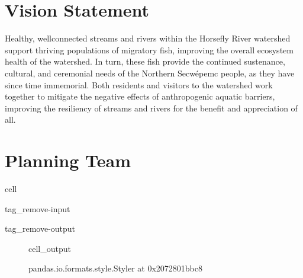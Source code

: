 \documentclass[letterpaper,10pt,english]{jupyterBook}
\begin{document}
\chapter{Vision Statement}
\label{\detokenize{Planning:vision-statement}}
\sphinxAtStartPar
Healthy, well\sphinxhyphen{}connected streams and rivers within the Horsefly River watershed support thriving populations of migratory fish, improving the overall ecosystem health of the watershed. In turn, these fish provide the continued sustenance, cultural, and ceremonial needs of the Northern Secwépemc people, as they have since time immemorial. Both residents and visitors to the watershed work together to mitigate the negative effects of anthropogenic aquatic barriers, improving the resiliency of streams and rivers for the benefit and appreciation of all.


\chapter{Planning Team}
\label{\detokenize{Planning:planning-team}}
\begin{sphinxuseclass}{cell}
\begin{sphinxuseclass}{tag_remove-input}
\begin{sphinxuseclass}{tag_remove-output}
\end{sphinxuseclass}
\end{sphinxuseclass}
\end{sphinxuseclass}
\begin{figure}[htbp]
\centering
\capstart
\begin{sphinxVerbatimOutput}

\begin{sphinxuseclass}{cell_output}
\begin{sphinxVerbatim}[commandchars=\\\{\}]
\PYGZlt{}pandas.io.formats.style.Styler at 0x2072801bbc8\PYGZgt{}
\end{sphinxVerbatim}

\end{sphinxuseclass}\end{sphinxVerbatimOutput}
\caption{}\label{\detokenize{Planning:table1}}\end{figure}
\end{document}
